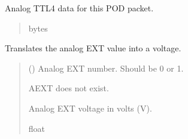 \documentclass[letterpaper,10pt,english]{sphinxmanual}
\begin{document}
\begin{fulllineitems}
\begin{fulllineitems}
\begin{quote}
\begin{description}
\end{description}\end{quote}

\end{fulllineitems}


\begin{fulllineitems}
\label{\detokenize{Morelia.Packets:Morelia.Packets.Binary5.PacketBinary5.aTTL4}}
\pysigstartsignatures
{}
\pysigstopsignatures
\sphinxAtStartPar
Analog TTL4 data for this POD packet.
\begin{quote}\begin{description}
\sphinxAtStartPar
bytes

\end{description}\end{quote}

\end{fulllineitems}


\begin{fulllineitems}
\label{\detokenize{Morelia.Packets:Morelia.Packets.Binary5.PacketBinary5.AnalogEXT}}
\pysigstartsignatures
{}
\pysigstopsignatures
\sphinxAtStartPar
Translates the analog EXT value into a voltage.
\begin{quote}\begin{description}
\sphinxAtStartPar
{} () \textendash{} Analog EXT number. Should be 0 or 1.

\sphinxAtStartPar
{} \textendash{} AEXT does not exist.

\sphinxAtStartPar
Analog EXT voltage in volts (V).

\sphinxAtStartPar
float

\end{description}\end{quote}


\end{fulllineitems}
\end{fulllineitems}
\end{document}
